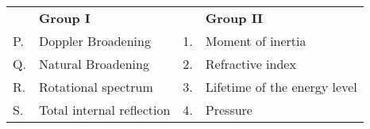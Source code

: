 \begin{tabular}{llll}
   &\textbf{Group I}  & &\textbf{Group II}  \\
    P. &Doppler Broadening & 1.& Moment of inertia\\
     Q. &Natural Broadening &2. & Refractive index\\
     R. &Rotational spectrum &3. &  Lifetime of the energy level\\
     S. &Total internal reflection &4.& Pressure\\
\end{tabular}
